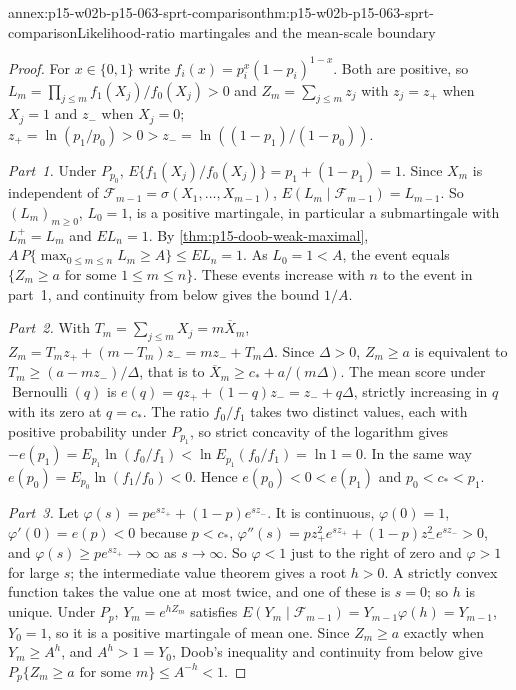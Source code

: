 \begin{annexitem}{annex:p15-w02b-p15-063-sprt-comparison}{thm:p15-w02b-p15-063-sprt-comparison}{Likelihood-ratio martingales and the mean-scale boundary}
\begin{proof}
For \(x\in\{0,1\}\) write \(f_i(x)=p_i^x(1-p_i)^{1-x}\). Both are positive,
so \(L_m=\prod_{j\leq m}f_1(X_j)/f_0(X_j)>0\) and
\(Z_m=\sum_{j\leq m}z_j\) with \(z_j=z_+\) when \(X_j=1\) and \(z_-\) when
\(X_j=0\); \(z_+=\ln(p_1/p_0)>0>z_-=\ln((1-p_1)/(1-p_0))\).

\emph{Part~1.} Under \(P_{p_0}\),
\(E\{f_1(X_j)/f_0(X_j)\}=p_1+(1-p_1)=1\). Since \(X_m\) is independent of
\(\mathcal F_{m-1}=\sigma(X_1,\ldots,X_{m-1})\),
\(E(L_m\mid\mathcal F_{m-1})=L_{m-1}\). So \((L_m)_{m\geq0}\), \(L_0=1\), is a
positive martingale, in particular a submartingale with
\(L_m^+=L_m\) and \(EL_n=1\). By \cref{thm:p15-doob-weak-maximal},
\(A\,P\{\max_{0\leq m\leq n}L_m\geq A\}\leq EL_n=1\). As
\(L_0=1<A\), the event equals \(\{Z_m\geq a\text{ for some }1\leq m\leq
n\}\). These events increase with \(n\) to the event in part~1, and
continuity from below gives the bound \(1/A\).

\emph{Part~2.} With \(T_m=\sum_{j\leq m}X_j=m\overline X_m\),
\(Z_m=T_mz_++(m-T_m)z_-=mz_-+T_m\Delta\). Since \(\Delta>0\),
\(Z_m\geq a\) is equivalent to \(T_m\geq(a-mz_-)/\Delta\), that is to
\(\overline X_m\geq c_*+a/(m\Delta)\). The mean score under
\(\operatorname{Bernoulli}(q)\) is \(e(q)=qz_++(1-q)z_-=z_-+q\Delta\),
strictly increasing in \(q\) with its zero at \(q=c_*\). The ratio
\(f_0/f_1\) takes two distinct values, each with positive probability under
\(P_{p_1}\), so strict concavity of the logarithm gives
\(-e(p_1)=E_{p_1}\ln(f_0/f_1)<\ln E_{p_1}(f_0/f_1)=\ln1=0\). In the same
way \(e(p_0)=E_{p_0}\ln(f_1/f_0)<0\). Hence \(e(p_0)<0<e(p_1)\) and
\(p_0<c_*<p_1\).

\emph{Part~3.} Let \(\varphi(s)=pe^{sz_+}+(1-p)e^{sz_-}\). It is
continuous, \(\varphi(0)=1\), \(\varphi'(0)=e(p)<0\) because \(p<c_*\),
\(\varphi''(s)=pz_+^2e^{sz_+}+(1-p)z_-^2e^{sz_-}>0\), and
\(\varphi(s)\geq pe^{sz_+}\to\infty\) as \(s\to\infty\). So \(\varphi<1\)
just to the right of zero and \(\varphi>1\) for large \(s\); the
intermediate value theorem gives a root \(h>0\). A strictly convex
function takes the value one at most twice, and one of these is \(s=0\);
so \(h\) is unique. Under \(P_p\), \(Y_m=e^{hZ_m}\) satisfies
\(E(Y_m\mid\mathcal F_{m-1})=Y_{m-1}\varphi(h)=Y_{m-1}\), \(Y_0=1\), so it is
a positive martingale of mean one. Since \(Z_m\geq a\) exactly when
\(Y_m\geq A^h\), and \(A^h>1=Y_0\), Doob's inequality and continuity from
below give \(P_p\{Z_m\geq a\text{ for some }m\}\leq A^{-h}<1\).


\end{proof}
\end{annexitem}
